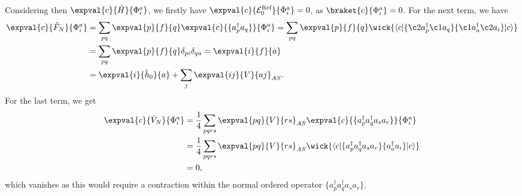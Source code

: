 Considering then $\expval{c}{\hat{H}}{\Phi_i^a}$, we firstly have $\expval{c}{\mathcal{E}_0^{\text{Ref}}}{\Phi_i^a} = 0$, as $\braket{c}{\Phi_i^a} = 0$.
For the next term, we have
\begin{align*}
    \expval{c}{\hat{F}_N}{\Phi_i^a} &= \sum_{pq} \expval{p}{f}{q} \expval{c}{\{ a_p^\dagger a_q \}}{\Phi_i^a}
    = \sum_{pq} \expval{p}{f}{q} \wick{
        \langle c \vert
        \{ \c2 a_p^\dagger \c1 a_q \}
        \{ \c1 a_a^\dagger \c2 a_i \}
        \vert c \rangle
    } \\
    &= \sum_{pq} \expval{p}{f}{q} \delta_{pi} \delta_{qa}
    = \expval{i}{f}{a} \\
    &= \expval{i}{\hat{h}_0}{a} + \sum_{j} \expval{ij}{V}{aj}_{AS}.
\end{align*}
For the last term, we get
\begin{align*}
    \expval{c}{\hat{V}_N}{\Phi_i^a} &= \frac{1}{4} \sum_{pqrs} \expval{pq}{V}{rs}_{AS} \expval{c}{\{a_p^\dagger a_q^\dagger a_s a_r \}}{\Phi_i^a} \\
    &= \frac{1}{4} \sum_{pqrs} \expval{pq}{V}{rs}_{AS} \wick{
        \langle c \vert
        \{ a_p^\dagger a_q^\dagger a_s a_r \}
        \{ a_a^\dagger a_i \}
        \vert c \rangle
    } \\
    &= 0,
\end{align*}
which vanishes as this would require a contraction within the normal ordered operator $\{a_p^\dagger a_q^\dagger a_s a_r\}$.

